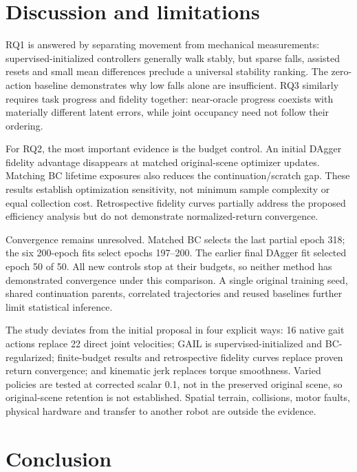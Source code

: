 \documentclass[conference]{IEEEtran}
\begin{document}
\section{Discussion and limitations}

RQ1 is answered by separating movement from mechanical measurements: supervised-initialized controllers generally walk stably, but sparse falls, assisted resets and small mean differences preclude a universal stability ranking. The zero-action baseline demonstrates why low falls alone are insufficient. RQ3 similarly requires task progress and fidelity together: near-oracle progress coexists with materially different latent errors, while joint occupancy need not follow their ordering.

For RQ2, the most important evidence is the budget control. An initial DAgger fidelity advantage disappears at matched original-scene optimizer updates. Matching BC lifetime exposures also reduces the continuation/scratch gap. These results establish optimization sensitivity, not minimum sample complexity or equal collection cost. Retrospective fidelity curves partially address the proposed efficiency analysis but do not demonstrate normalized-return convergence.

Convergence remains unresolved. Matched BC selects the last partial epoch 318; the six 200-epoch fits select epochs 197--200. The earlier final DAgger fit selected epoch 50 of 50. All new controls stop at their budgets, so neither method has demonstrated convergence under this comparison. A single original training seed, shared continuation parents, correlated trajectories and reused baselines further limit statistical inference.

The study deviates from the initial proposal in four explicit ways: 16 native gait actions replace 22 direct joint velocities; GAIL is supervised-initialized and BC-regularized; finite-budget results and retrospective fidelity curves replace proven return convergence; and kinematic jerk replaces torque smoothness. Varied policies are tested at corrected scalar 0.1, not in the preserved original scene, so original-scene retention is not established. Spatial terrain, collisions, motor faults, physical hardware and transfer to another robot are outside the evidence.

\section{Conclusion}
\end{document}
